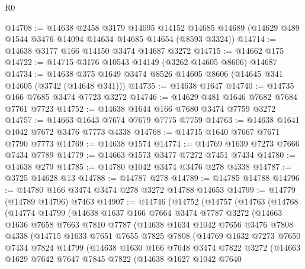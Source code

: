 \begin{lexlean}{R0}
\begin{coremodule}
@14708 := @14638
    @2458
    @3179
    @14095
    @14152
    @14685
    @14689
    (@14629 @489 @1544 @3476 @14094 @14634 @14685 @14654 (@8593 @3324))
@14714 := @14638 @3177 @166 @14150 @3474 @14687 @3272
@14715 := @14662 @175
@14722 := @14715 @3176 @10543 @14149 (@3262 @14605 @8606) @14687
@14734 := @14638 @375 @1649 @3474 @8526 @14605 @8606 (@14645 @341 @14605 (@3742 (@14648 @341)))
@14735 := @14638 @1647
@14740 := @14735 @166 @7685 @3474 @7723 @3272
@14746 := @14629 @481 @1646 @7682 @7684 @7761 @7723
@14752 := @14638 @1644 @166 @7680 @3474 @7759 @3272
@14757 := @14663 @1643 @7674 @7679 @7775 @7759
@14763 := @14638 @1641 @1042 @7672 @3476 @7773 @4338
@14768 := @14715 @1640 @7667 @7671 @7790 @7773
@14769 := @14638 @1574
@14774 := @14769 @1639 @7273 @7666 @7434 @7789
@14779 := @14663 @1573 @3477 @7272 @7451 @7434
@14780 := @14638 @279
@14785 := @14780 @1042 @3474 @3476 @278 @4338
@14787 := @3725 @14628 @13
@14788 := @14787 @278
@14789 := @14785 @14788
@14796 := @14780 @166 @3474 @3474 @278 @3272 @14788 @14653
@14799 := @14779 (@14789 @14796) @7463
@14907 := @14746
    (@14752
      (@14757
        (@14763
          (@14768
            (@14774
              @14799
              (@14638
                @1637
                @166
                @7664
                @3474
                @7787
                @3272
                (@14663
                  @1636
                  @7658
                  @7663
                  @7810
                  @7787
                  (@14638
                    @1634
                    @1042
                    @7656
                    @3476
                    @7808
                    @4338
                    (@14715
                      @1633
                      @7651
                      @7655
                      @7825
                      @7808
                      (@14769
                        @1632
                        @7273
                        @7650
                        @7434
                        @7824
                        @14799
                        (@14638
                          @1630
                          @166
                          @7648
                          @3474
                          @7822
                          @3272
                          (@14663
                            @1629
                            @7642
                            @7647
                            @7845
                            @7822
                            (@14638
                              @1627
                              @1042
                              @7640

\end{coremodule}
\end{lexlean}
